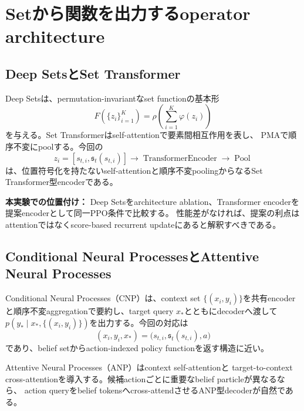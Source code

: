 \documentclass[a4paper,11pt]{article}
\newcommand{\recommendation}{\par\noindent\textbf{本実験での位置付け：}}
\begin{document}
\section{Setから関数を出力するoperator architecture}

\subsection{Deep SetsとSet Transformer}

Deep Sets\cite{zaheer2017deepsets}は、permutation-invariantなset functionの基本形
\begin{equation}
  F(\{z_i\}_{i=1}^{K})
  =\rho\!\left(\sum_{i=1}^{K}\varphi(z_i)\right)
  \label{eq:deep-sets}
\end{equation}
を与える。Set Transformer\cite{lee2019settransformer}はself-attentionで要素間相互作用を表し、
PMAで順序不変にpoolする。今回の
\begin{equation}
  z_i=[s_{t,i},\mathfrak{s}_t(s_{t,i})]
  \longrightarrow \operatorname{TransformerEncoder}
  \longrightarrow \operatorname{Pool}
  \label{eq:set-policy-encoder}
\end{equation}
は、位置符号化を持たないself-attentionと順序不変poolingからなるSet Transformer型encoderである。

\recommendation
Deep Setsをarchitecture ablation、Transformer encoderを提案encoderとして同一PPO条件で比較する。
性能差がなければ、提案の利点はattentionではなくscore-based recurrent updateにあると解釈すべきである。

\subsection{Conditional Neural ProcessesとAttentive Neural Processes}

Conditional Neural Processes（CNP）\cite{garnelo2018cnp}は、context set
$\{(x_i,y_i)\}$を共有encoderと順序不変aggregationで要約し、target query $x_*$とともにdecoderへ渡して
$p(y_*\mid x_*,\{(x_i,y_i)\})$を出力する。今回の対応は
\begin{equation}
  (x_i,y_i,x_*)
  =\bigl(s_{t,i},\mathfrak{s}_t(s_{t,i}),a\bigr)
  \label{eq:cnp-correspondence}
\end{equation}
であり、belief setからaction-indexed policy functionを返す構造に近い。

Attentive Neural Processes（ANP）\cite{kim2019anp}はcontext self-attentionと
target-to-context cross-attentionを導入する。候補actionごとに重要なbelief particleが異なるなら、
action queryをbelief tokensへcross-attendさせるANP型decoderが自然である。
\end{document}
